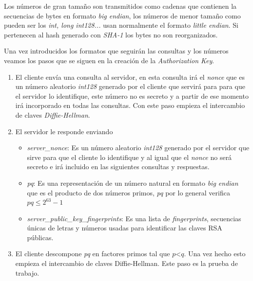 Los números de gran tamaño son transmitidos como cadenas que contienen la secuencias de bytes en formato \emph{big endian}, los números de menor tamaño como pueden ser los \emph{int, long int128...} usan normalmente el formato \emph{little endian}. Si pertenecen al hash generado con \emph{SHA-1} los bytes no son reorganizados.

Una vez introducidos los formatos que seguirán las consultas y los números veamos los pasos que se siguen en la creación de la \emph{Authorization Key}.

\begin{enumerate}
	\item El cliente envía una consulta al servidor, en esta consulta irá el \emph{nonce} que es un número aleatorio \emph{int128} generado por el cliente que servirá para para que el servidor lo identifique, este número no es secreto y a partir de ese momento irá incorporado en todas las consultas. Con este paso empieza el intercambio de claves \emph{Diffie-Hellman}.
	
	\item El servidor le responde enviando 
	\begin{itemize}
		\item \emph{server\_nonce}: Es un número aleatorio \emph{int128} generado por el servidor que sirve para que el cliente lo identifique y al igual que el \emph{nonce} no será secreto e irá incluido en las siguientes consultas y respuestas. 
		\item \emph{pq}: Es una representación de un número natural en formato \emph{big endian} que es el producto de dos números primos, \emph{pq} por lo general verifica $pq \leq 2^{63}-1$
		\item \emph{server\_public\_key\_fingerprints}: Es una lista de \emph{fingerprints}, secuencias únicas de letras y números usadas para identificar las claves RSA públicas.
	\end{itemize}

	\item El cliente descompone \emph{pq} en factores primos tal que $p$\textless$q$. Una vez hecho esto empieza el intercambio de claves Diffie-Hellman. Este paso es la prueba de trabajo.


\end{enumerate}
